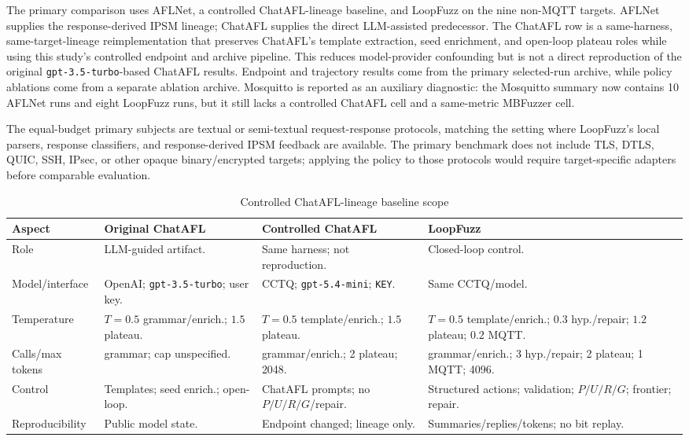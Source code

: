 \documentclass[final,5p,times,number]{elsarticle}
\begin{document}
The primary comparison uses AFLNet, a controlled ChatAFL-lineage baseline, and LoopFuzz on the nine non-MQTT targets. AFLNet supplies the response-derived IPSM lineage; ChatAFL supplies the direct LLM-assisted predecessor. The ChatAFL row is a same-harness, same-target-lineage reimplementation that preserves ChatAFL's template extraction, seed enrichment, and open-loop plateau roles while using this study's controlled endpoint and archive pipeline. This reduces model-provider confounding but is not a direct reproduction of the original \texttt{gpt-3.5-turbo}-based ChatAFL results. Endpoint and trajectory results come from the primary selected-run archive, while policy ablations come from a separate ablation archive. Mosquitto is reported as an auxiliary diagnostic: the Mosquitto summary now contains 10 AFLNet runs and eight LoopFuzz runs, but it still lacks a controlled ChatAFL cell and a same-metric MBFuzzer cell.

The equal-budget primary subjects are textual or semi-textual request-response protocols, matching the setting where LoopFuzz's local parsers, response classifiers, and response-derived IPSM feedback are available. The primary benchmark does not include TLS, DTLS, QUIC, SSH, IPsec, or other opaque binary/encrypted targets; applying the policy to those protocols would require target-specific adapters before comparable evaluation.

\begin{table}[!t]
\centering
\caption{Controlled ChatAFL-lineage baseline scope}
\label{tab:chatafl_config_scope}
{\scriptsize
\setlength{\tabcolsep}{3.0pt}
\renewcommand{\arraystretch}{1.12}
\begin{tabularx}{\textwidth}{>{\raggedright\arraybackslash}p{}
>{\raggedright\arraybackslash}X
>{\raggedright\arraybackslash}X
>{\raggedright\arraybackslash}X}
\toprule
Aspect & Original ChatAFL & Controlled ChatAFL & LoopFuzz \\
\midrule
Role &
LLM-guided artifact. &
Same harness; not reproduction. &
Closed-loop control. \\
Model/interface &
OpenAI; \texttt{gpt-3.5-turbo}; user key. &
CCTQ; \texttt{gpt-5.4-mini}; \texttt{KEY}. &
Same CCTQ/model. \\
Temperature &
$T{=}0.5$ grammar/enrich.; $1.5$ plateau. &
$T{=}0.5$ template/enrich.; $1.5$ plateau. &
$T{=}0.5$ template/enrich.; $0.3$ hyp./repair; $1.2$ plateau; $0.2$ MQTT. \\
Calls/max tokens &
5 grammar; cap unspecified. &
5 grammar/enrich.; 2 plateau; 2048. &
5 grammar/enrich.; 3 hyp./repair; 2 plateau; 1 MQTT; 4096. \\
Control &
Templates; seed enrich.; open-loop. &
ChatAFL prompts; no $P/U/R/G$/repair. &
Structured actions; validation; $P/U/R/G$; frontier; repair. \\
Reproducibility &
Public model state. &
Endpoint changed; lineage only. &
Summaries/replies/tokens; no bit replay. \\
\bottomrule
\end{tabularx}
}
\end{table}
\end{document}
